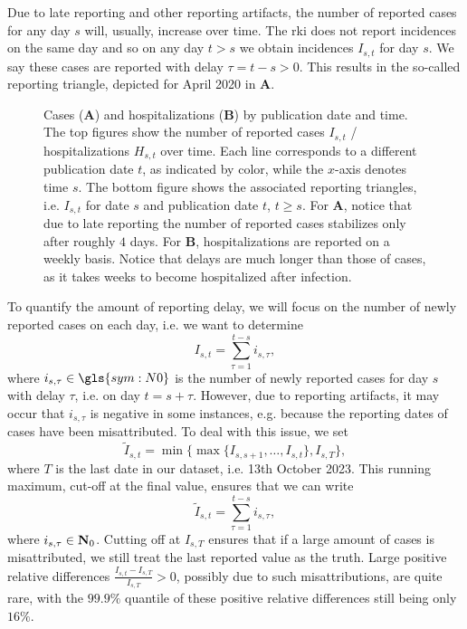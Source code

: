 Due to late reporting and other reporting artifacts, the number of reported cases for any day $s$ will, usually, increase over time. The \acrshort{rki} does not report incidences on the same day and so on any day $t > s$ we obtain incidences $I_{s,t}$ for day $s$. We say these cases are reported with delay $\tau = t -s > 0$. This results in the so-called reporting triangle, depicted for April 2020 in  \textbf{A}. 

\begin{figure}
    \resizebox{\textwidth}{!}{%
    }
    \caption{Cases (\textbf{A}) and hospitalizations (\textbf{B}) by publication date and time. The top figures show the number of reported cases $I_{s,t}$ / hospitalizations $H_{s,t}$ over time. Each line corresponds to a different publication date $t$, as indicated by color, while the $x$-axis denotes time $s$. The bottom figure shows the associated reporting triangles, i.e. $I_{s,t}$ for date $s$ and publication date $t$, $t \geq s$.
    For \textbf{A}, notice that due to late reporting the number of reported cases stabilizes only after roughly $4$ days.
    For \textbf{B}, hospitalizations are reported on a weekly basis. Notice that delays are much longer than those of cases, as it takes weeks to become hospitalized after infection.}
    \label{fig:reporting_delays_cases}
\end{figure}

To quantify the amount of reporting delay, we will focus on the number of newly reported cases on each day, i.e. we want to determine
$$
    I_{s,t} = \sum_{\tau = 1}^{t - s} i_{s,\tau},
$$
where $i_{s,\tau} \in \gls{sym:N0}$ is the number of newly reported cases for day $s$ with delay $\tau$, i.e. on day $t = s + \tau$. However, due to reporting artifacts, it may occur that $i_{s,\tau}$ is negative in some instances, e.g. because the reporting dates of cases have been misattributed. To deal with this issue, we set 
$$
    \tilde I_{s,t} = \min \{\max \{I_{s,s + 1}, \dots, I_{s, t}\}, I_{s, T}\},
$$
where $T$ is the last date in our dataset, i.e. 13th October 2023. This running maximum, cut-off at the final value, ensures that we can write 
$$
    \tilde I_{s,t} =  \sum_{\tau = 1}^{t - s} i_{s,\tau},
$$
where $i_{s,\tau} \in \mathbf N_0$. Cutting off at $I_{s,T}$ ensures that if a large amount of cases is misattributed, we still treat the last reported value as the truth. Large positive relative differences $ \frac{I_{s, t} - I_{s,T}}{I_{s,T}} > 0$, possibly due to such misattributions, are quite rare, with the $99.9\%$ quantile of these positive relative differences still being only $16\%$.


